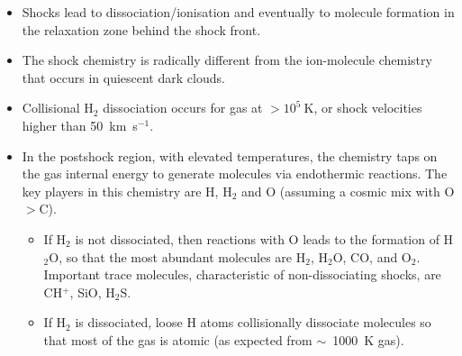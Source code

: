 
\begin{itemize}
\item Shocks lead to dissociation/ionisation and eventually to
  molecule formation in the relaxation zone behind the shock front. 

\item  The shock chemistry is radically different from the
  ion-molecule chemistry that occurs in quiescent dark clouds. 

\item Collisional H$_2$ dissociation occurs for gas at $>10^5~$K, or
  shock velocities higher than 50~km~s$^{-1}$. 

\item In the postshock region, with elevated temperatures, the
  chemistry taps on the gas internal energy to generate molecules via
  endothermic reactions.  The key players in this chemistry are H,
  H$_2$ and O (assuming a cosmic mix with O$>$C). 

  \begin{itemize}
    \item If H$_2$ is not dissociated, then reactions with O leads to
      the formation of H$_2$O, so that the most abundant molecules are
      H$_2$, H$_2$O, CO, and O$_2$. Important trace molecules,
      characteristic of non-dissociating shocks, are CH$^+$, SiO,
      H$_2$S. 

      \item If H$_2$ is dissociated, loose H atoms collisionally
        dissociate molecules so that most of the gas is atomic (as
        expected from $\sim$~1000~K gas). 
\end{itemize}
\end{itemize}


